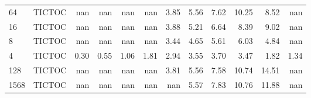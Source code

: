\begin{tabular}{llrrrrrrrrrr}
64   & TICTOC &  nan &  nan &  nan &  nan & 3.85 & 5.56 &  7.62 & 10.25 &  8.52 &  nan \\
16   & TICTOC &  nan &  nan &  nan &  nan & 3.88 & 5.21 &  6.64 &  8.39 &  9.02 &  nan \\
8    & TICTOC &  nan &  nan &  nan &  nan & 3.44 & 4.65 &  5.61 &  6.03 &  4.84 &  nan \\
4    & TICTOC & 0.30 & 0.55 & 1.06 & 1.81 & 2.94 & 3.55 &  3.70 &  3.47 &  1.82 & 1.34 \\
128  & TICTOC &  nan &  nan &  nan &  nan & 3.81 & 5.56 &  7.58 & 10.74 & 14.51 &  nan \\
1568 & TICTOC &  nan &  nan &  nan &  nan &  nan & 5.57 &  7.83 & 10.76 & 11.88 &  nan \\
\bottomrule
\end{tabular}
